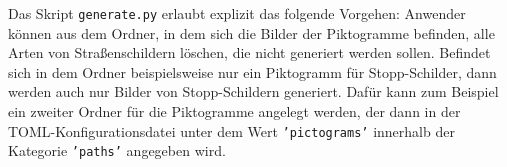 Das Skript \texttt{generate.py} erlaubt explizit das folgende Vorgehen: Anwender können aus dem Ordner, in dem sich die Bilder der Piktogramme befinden, alle Arten von Straßenschildern löschen, die nicht generiert werden sollen. Befindet sich in dem Ordner beispielsweise nur ein Piktogramm für Stopp-Schilder, dann werden auch nur Bilder von Stopp-Schildern generiert. Dafür kann zum Beispiel ein zweiter Ordner für die Piktogramme angelegt werden, der dann in der \ac{TOML}-Konfigurationsdatei unter dem Wert \texttt{'pictograms'} innerhalb der Kategorie \texttt{'paths'} angegeben wird.